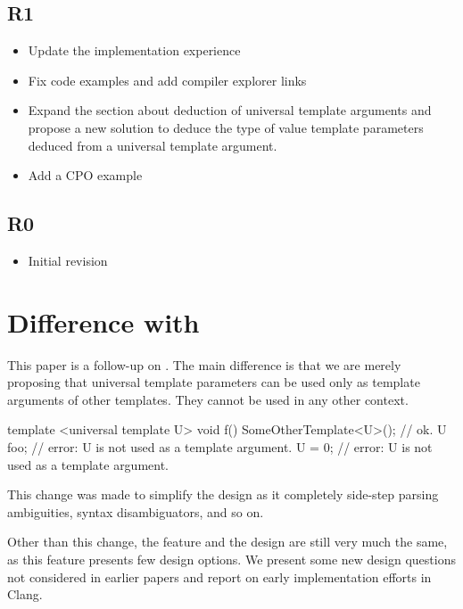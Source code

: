 \documentclass{wg21}
\begin{document}
\subsection{R1}

\begin{itemize}
\item Update the implementation experience
\item Fix code examples and add compiler explorer links
\item Expand the section about deduction of universal template arguments and propose a new solution to deduce the type of value template parameters deduced from a universal template argument.
\item Add a CPO example
\end{itemize}

\subsection{R0}

\begin{itemize}
    \item{Initial revision}
\end{itemize}


\section{Difference with }

This paper is a follow-up on .
The main difference is that we are merely proposing that universal template parameters can be used only as template arguments of other templates.
They cannot be used in any other context.

\begin{colorblock}
template <universal template U>
void f() {
  SomeOtherTemplate<U>(); // ok.
  U foo; // error: U is not used as a template argument.
  U = 0; // error: U is not used as a template argument.
}
\end{colorblock}

This change was made to simplify the design as it completely side-step parsing ambiguities, syntax disambiguators, and so on.

Other than this change, the feature and the design are still very much the same, as this feature presents few design options.
We present some new design questions not considered in earlier papers and report on early implementation efforts in Clang.
\end{document}
